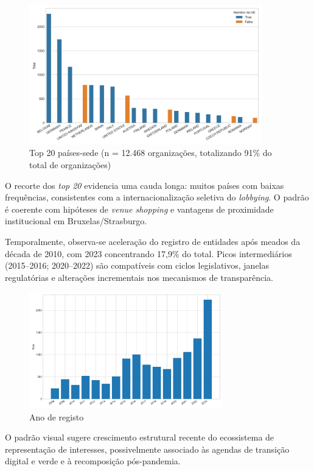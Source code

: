 \begin{figure}[!htbp]
\centering
\includegraphics[width=0.9\textwidth]{figures/country_distribution_top20.png}
\caption{Top 20 países-sede (n = 12.468 organizações, totalizando 91\% do total de organizações)}
\end{figure}

O recorte dos \textit{top 20} evidencia uma cauda longa: muitos países com baixas frequências, consistentes com a internacionalização seletiva do \textit{lobbying}. O padrão é coerente com hipóteses de \textit{venue shopping} e vantagens de proximidade institucional em Bruxelas/Strasburgo.

Temporalmente, observa-se aceleração do registro de entidades após meados da década de 2010, com 2023 concentrando 17,9\% do total. Picos intermediários (2015--2016; 2020--2022) são compatíveis com ciclos legislativos, janelas regulatórias e alterações incrementais nos mecanismos de transparência.

\begin{figure}[!htbp]
\centering
\includegraphics[width=0.75\textwidth]{figures/year_distribution.png}
\caption{Ano de registo}
\end{figure}

O padrão visual sugere crescimento estrutural recente do ecossistema de representação de interesses, possivelmente associado às agendas de transição digital e verde e à recomposição pós-pandemia.

